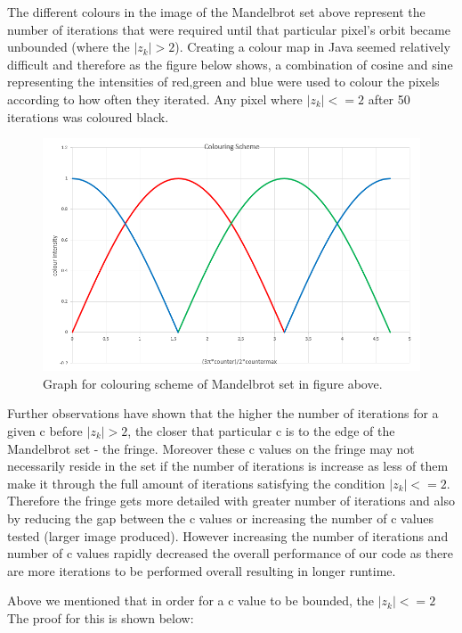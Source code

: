 \documentclass[a4wide, 10pt]{article}
\begin{document}
The different colours in the image of the Mandelbrot set above represent the number of iterations that
 were required until that particular pixel's orbit became unbounded (where the  $|z_{k}| > 2$).
  Creating a colour map in Java seemed relatively difficult and therefore as the figure below shows, a
   combination of cosine and sine representing the intensities of red,green and blue were used to colour the pixels according to how often they iterated.
    Any pixel where $|z_{k}| <= 2$ after 50 iterations  was coloured black. 
\begin{figure}[H]
\centering
\includegraphics[scale=0.3]{MandelbrotSet/colourscheme.png}
\caption{Graph for colouring scheme of Mandelbrot set in figure above.}
\end{figure}
Further observations have shown that the higher the number of iterations for a given c before $|z_{k}|
 > 2$, the closer that particular c is to the edge of the Mandelbrot set - the fringe. Moreover these c
  values on the fringe may not necessarily reside in the set if the number of iterations is increase as
   less of them make it through the full amount of iterations satisfying the condition $|z_{k}| <= 2$.
    Therefore the fringe gets more detailed with  greater number of iterations and also by reducing the
     gap between the c values or increasing the number of c values tested (larger image produced).
      However increasing the number of iterations and number of c values rapidly decreased the overall
       performance of our code as there are more iterations to be performed overall resulting in longer
        runtime.

Above we mentioned that in order for a c value to be bounded, the $|z_{k}| <=2$ The proof for this is shown below:
\end{document}
